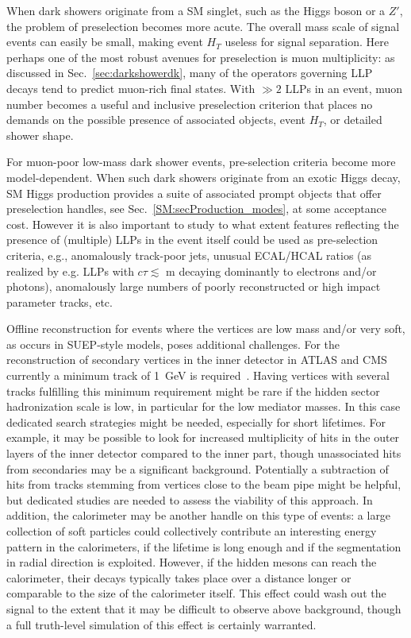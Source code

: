 When dark showers originate from a SM singlet, such as the Higgs boson or a $Z'$, the problem of preselection becomes more acute. The overall mass scale of signal events can easily be small, making event $H_T$ useless for signal separation.   Here perhaps one of the most robust avenues for preselection is muon multiplicity: as discussed in Sec.~\ref{sec:darkshowerdk}, many of the operators governing LLP decays tend to predict muon-rich final states.  With $\gg 2$ LLPs in an event, muon number becomes a useful and inclusive preselection criterion that places no demands on the possible presence of associated objects, event $H_T$, or detailed shower shape.  

For muon-poor low-mass dark shower events, pre-selection criteria become more model-dependent. When such dark showers originate from an exotic Higgs decay, SM Higgs production provides a suite of associated prompt objects that offer preselection handles, see Sec.~\ref{SM:secProduction_modes}, at some acceptance cost.   However it is also important to study to what extent features reflecting the presence of (multiple) LLPs in the event itself could be used as pre-selection criteria, e.g., anomalously track-poor jets, unusual ECAL/HCAL ratios (as realized by e.g. LLPs with $c\tau \lesssim$ m decaying dominantly to electrons and/or photons), anomalously large numbers of poorly reconstructed or high impact parameter tracks, etc.

Offline reconstruction for events where the vertices are low mass and/or very soft, as occurs in SUEP-style models, poses additional challenges. For the reconstruction of secondary vertices in the inner detector in ATLAS and CMS currently a minimum track \pt of 1~GeV is required~\cite{Aaboud:2017iio,Chatrchyan:2012jua}. Having vertices with several tracks fulfilling this minimum \pt requirement might be rare if the hidden sector hadronization scale is low, in particular for the low mediator masses. In this case dedicated search strategies might be needed, especially for short lifetimes. For example, it may be possible to look for increased multiplicity of hits in the outer layers of the inner detector compared to the inner part, though unassociated hits from secondaries may be a significant background. Potentially a subtraction of hits from tracks stemming from vertices close to the beam pipe might be helpful, but dedicated studies are needed to assess the viability of this approach.
In addition, the calorimeter may be another handle on this type of events: a large collection of soft particles could collectively contribute an interesting energy pattern in the calorimeters, if the lifetime is long enough and if the segmentation in radial direction is exploited. However, if the hidden mesons can reach the calorimeter, their decays typically takes place over a distance longer or comparable to the size of the calorimeter itself. This effect could wash out the signal to the extent that it may be difficult to observe above background, though a full truth-level simulation of this effect is certainly warranted.
 
